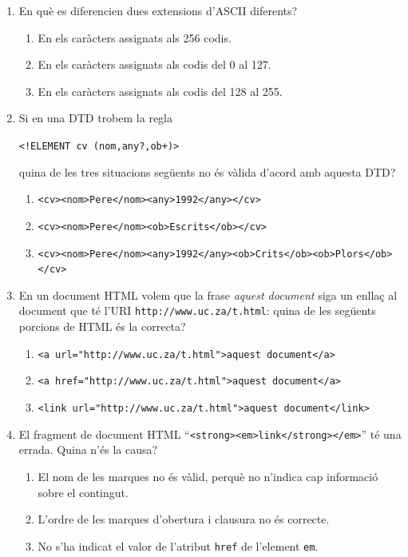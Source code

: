 \begin{enumerate}
\item En què es diferencien dues extensions d'ASCII diferents?
  \begin{enumerate}
  \item En els caràcters assignats als 256 codis.
  \item En els caràcters assignats als codis del 0 al 127.
  \item En els caràcters assignats als codis del 128 al 255.
\end{enumerate}

\item Si en una DTD trobem la regla
   \begin{center}\verb|<!ELEMENT cv (nom,any?,ob+)>|\end{center}
   quina de les tres situacions següents no és vàlida d'acord amb
   aquesta DTD?
   \begin{enumerate}
   \item \verb|<cv><nom>Pere</nom><any>1992</any></cv>|
   \item \verb|<cv><nom>Pere</nom><ob>Escrits</ob></cv>|
   \item \verb|<cv><nom>Pere</nom><any>1992</any><ob>Crits</ob><ob>Plors</ob></cv>|
   \end{enumerate}

 \item En un document HTML volem que la frase \emph{aquest document}
   siga un enllaç al document que té l'URI
   \verb|http://www.uc.za/t.html|: quina de les següents porcions de
   HTML és la correcta?
   \begin{enumerate}
   \item \verb|<a url="http://www.uc.za/t.html">aquest document</a>|
   \item \verb|<a href="http://www.uc.za/t.html">aquest document</a>|
   \item \verb|<link url="http://www.uc.za/t.html">aquest document</link>|
   \end{enumerate}

 \item El fragment de document HTML
   ``\verb|<strong><em>link</strong></em>|'' té una errada. Quina n'és
   la causa?
   \begin{enumerate}
   \item El nom de les marques no és vàlid, perquè no n'indica cap
     informació sobre el contingut.
   \item L'ordre de les marques d'obertura i clausura no és correcte.
   \item No s'ha indicat el valor de l'atribut \verb|href| de
     l'element \verb|em|.
   \end{enumerate}


\end{enumerate}
